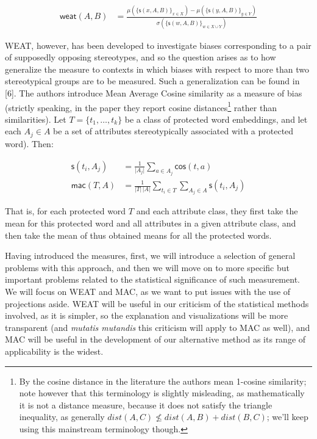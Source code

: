 \documentclass[
  10pt,
  dvipsnames,enabledeprecatedfontcommands]{scrartcl}
\begin{document}
\vspace{-2mm}

\footnotesize

\begin{align}
\mathsf{weat}(A,B) & = \frac{
\mu(\{\mathsf{s}(x,A,B)\}_{x\in X}) -\mu(\{\mathsf{s}(y,A,B)\}_{y\in Y}) 
}{
\sigma(\{\mathsf{s}(w,A,B)\}_{w\in X\cup Y})
}
\end{align}

\normalsize

WEAT, however, has been developed to investigate biases corresponding to
a pair of supposedly opposing stereotypes, and so the question arises as
to how generalize the measure to contexts in which biases with respect
to more than two stereotypical groups are to be measured. Such a
generalization can be found in {[}6{]}. The authors introduce Mean
Average Cosine similarity as a measure of bias (strictly speaking, in
the paper they report cosine distances\footnote{By the cosine distance
  in the literature the authors mean 1-cosine similarity; note however
  that this terminology is slightly misleading, as mathematically it is
  not a distance measure, because it does not satisfy the triangle
  inequality, as generally \(dist(A,C) \not \leq dist(A,B)+ dist(B,C)\);
  we'll keep using this mainstream terminology though.} rather than
similarities). Let \(T = \{t_1, \dots, t_k\}\) be a class of protected
word embeddings, and let each \(A_j\in A\) be a set of attributes
stereotypically associated with a protected word). Then:

\vspace{-2mm }
\footnotesize

\begin{align}
\mathsf{s}(t_i, A_j) & = \frac{1}{\vert A_j\vert}\sum_{a\in A_j}\mathsf{cos}(t,a) \\
\mathsf{mac}(T,A) & = \frac{1}{\vert T \vert \,\vert A\vert}\sum_{t_i \in T }\sum_{A_j \in A} \mathsf{s}(t_i,A_j)
\end{align}

\normalsize

\noindent That is, for each protected word \(T\) and each attribute
class, they first take the mean for this protected word and all
attributes in a given attribute class, and then take the mean of thus
obtained means for all the protected words.

Having introduced the measures, first, we will introduce a selection of
general problems with this approach, and then we will move on to more
specific but important problems related to the statistical significance
of such measurement. We will focus on WEAT and MAC, as we want to put
issues with the use of projections aside. WEAT will be useful in our
criticism of the statistical methods involved, as it is simpler, so the
explanation and visualizations will be more transparent (and
\emph{mutatis mutandis} this criticism will apply to MAC as well), and
MAC will be useful in the development of our alternative method as its
range of applicability is the widest.
\end{document}
